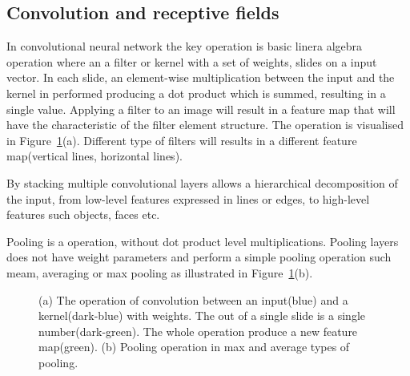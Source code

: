 \subsection{Convolution and receptive fields}

In convolutional neural network the key operation is basic linera algebra operation where an a filter or kernel with a set of weights, slides on a input vector. In each slide, an element-wise multiplication between the input and the kernel in performed producing a dot product which is summed, resulting in a single value. Applying a filter to an image will result in a feature map that will have the characteristic of the filter element structure. The operation is visualised in Figure~\ref{c3:fig_convolution}(a). Different type of filters will results in a different feature map(vertical lines, horizontal lines).

By stacking multiple convolutional layers allows a hierarchical decomposition of the input, from low-level features expressed in lines or edges, to high-level features such objects, faces etc.

Pooling is a operation, without dot product level multiplications. Pooling layers does not have weight parameters and perform a simple pooling operation such meam, averaging or max pooling as illustrated in Figure~\ref{c3:fig_convolution}(b).


\begin{figure}[h!]
    \centering  
    \caption{(a) The operation of convolution between an input(blue) and a kernel(dark-blue) with weights. The out of a single slide is a single number(dark-green). The whole operation produce a new feature map(green). (b) Pooling operation in max and average types of pooling.}
    \label{c3:fig_convolution}
\end{figure}

